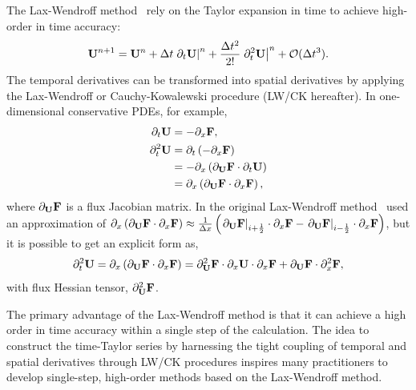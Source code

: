 The Lax-Wendroff method~\cite{lax1959systems} rely on the Taylor expansion in time
to achieve high-order in time accuracy:
\begin{equation}\label{eq:lw_time_taylor}
    \mathbf{U}^{n + 1} = \mathbf{U}^{n} + \Delta t \left. \partial_{t} \mathbf{U} \right|^{n} + \frac{\Delta t^{2}}{2!} \left.\partial^{2}_{t} \mathbf{U}\right|^{n} + \mathcal{O}(\Delta t^{3}).
\end{equation}
The temporal derivatives can be transformed into spatial derivatives
by applying the Lax-Wendroff or Cauchy-Kowalewski procedure (LW/CK hereafter).
In one-dimensional conservative PDEs, for example,
\begin{equation}\label{eq:lw_1d_ck_procedure}
    \begin{split}
        \partial_{t} \mathbf{U} &= -\partial_{x} \mathbf{F}, \\
        \partial^{2}_{t} \mathbf{U} &= \partial_{t} \left( -\partial_{x} \mathbf{F}\right) \\
                     &= -\partial_{x} \left( \partial_{\mathbf{U}} \mathbf{F} \cdot \partial_{t} \mathbf{U} \right) \\
                     &= \partial_{x} \left( \partial_{\mathbf{U}} \mathbf{F} \cdot \partial_{x} \mathbf{F} \right),
    \end{split}
\end{equation}
where \( \partial_{\mathbf{U}} \mathbf{F} \) is a flux Jacobian matrix.
In the original Lax-Wendroff method~\cite{lax1959systems} used an approximation of \( \partial_{x} \left( \partial_{\mathbf{U}} \mathbf{F} \cdot \partial_{x} \mathbf{F} \right) \approx
\frac{1}{\Delta x}\left( \left.\partial_{\mathbf{U}} \mathbf{F} \right|_{{i+\frac{1}{2}}} \cdot \partial_{x} \mathbf{F} - \left.\partial_{\mathbf{U}} \mathbf{F} \right|_{{i-\frac{1}{2}}} \cdot \partial_{x} \mathbf{F} \right) \),
but it is possible to get an explicit form as,
\begin{equation}\label{}
    \partial^{2}_{t} \mathbf{U} = \partial_{x} \left( \partial_{\mathbf{U}} \mathbf{F} \cdot \partial_{x} \mathbf{F} \right) = \partial^{2}_{\mathbf{U}} \mathbf{F} \cdot \partial_{x} \mathbf{U} \cdot \partial_{x} \mathbf{F} + \partial_{\mathbf{U}} \mathbf{F} \cdot \partial^{2}_{x} \mathbf{F},
\end{equation}
with flux Hessian tensor, \( \partial^{2}_{\mathbf{U}} \mathbf{F} \).

The primary advantage of the Lax-Wendroff method is that
it can achieve a high order in time accuracy within a single step of the calculation.
The idea to construct the time-Taylor series by harnessing the tight coupling of temporal
and spatial derivatives through LW/CK procedures inspires many practitioners
to develop single-step, high-order methods based on the Lax-Wendroff method.

